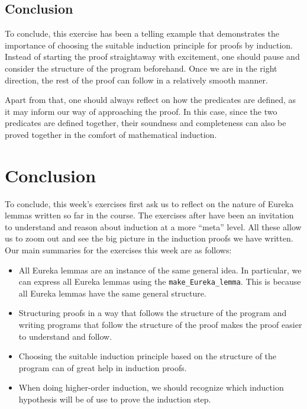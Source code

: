 \documentclass{article}
\begin{document}
\subsection{Conclusion}
To conclude, this exercise has been a telling example that demonstrates the importance of choosing the suitable induction principle for proofs by induction. Instead of starting the proof straightaway with excitement, one should pause and consider the structure of the program beforehand. Once we are in the right direction, the rest of the proof can follow in a relatively smooth manner. 

Apart from that, one should always reflect on how the predicates are defined, as it may inform our way of approaching the proof. In this case, since the two predicates are defined together, their soundness and completeness can also be proved together in the comfort of mathematical induction.

\newpage

\section{Conclusion}

To conclude, this week's exercises first ask us to reflect on the nature of Eureka lemmas written so far in the course. The exercises after have been an invitation to understand and reason about induction at a more ``meta'' level. All these allow us to zoom out and see the big picture in the induction proofs we have written. Our main summaries for the exercises this week are as follows:

\begin{itemize}
  \item All Eureka lemmas are an instance of the same general idea. In particular, we can express all Eureka lemmas using the \texttt{make\_Eureka\_lemma}. This is because all Eureka lemmas have the same general structure.
  \item Structuring proofs in a way that follows the structure of the program and writing programs that follow the structure of the proof makes the proof easier to understand and follow.
  \item Choosing the suitable induction principle based on the structure of the program can of great help in induction proofs.
  \item When doing higher-order induction, we should recognize which induction hypothesis will be of use to prove the induction step.
\end{itemize}
\end{document}
